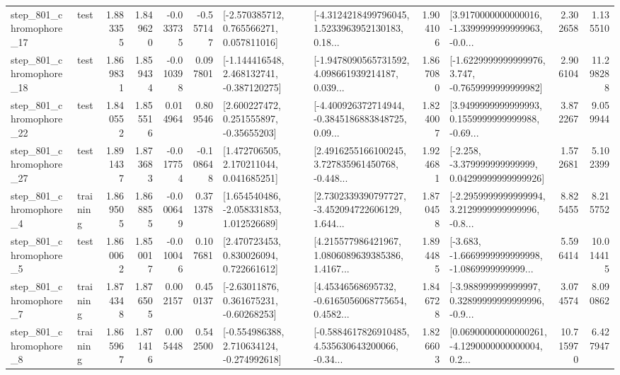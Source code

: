 \begin{tabular}{llrrrrllrlrr}
  step\_801\_chromophore\_17 &      test &      1.883355 &    1.849620 &     -0.033735 & -0.557147 &    [-2.570385712, 0.765566271, 0.057811016] &  [-4.3124218499796045, 1.5233963952130183, 0.18... &       1.904106 &  [3.9170000000000016, -1.3399999999999963, -0.0... &            2.302658 &          1.135510 \\
  step\_801\_chromophore\_18 &      test &      1.869831 &    1.859434 &     -0.010398 &  0.097801 &   [-1.144416548, 2.468132741, -0.387120275] &  [-1.9478090565731592, 4.098661939214187, 0.039... &       1.867080 &  [-1.6229999999999976, 3.747, -0.7659999999999982] &            2.906104 &         11.298288 \\
  step\_801\_chromophore\_22 &      test &      1.840552 &    1.855516 &      0.014964 &  0.809546 &     [2.600227472, 0.251555897, -0.35655203] &  [-4.400926372714944, -0.3845186883848725, 0.09... &       1.824007 &  [3.9499999999999993, 0.1559999999999988, -0.69... &            3.872267 &          9.059944 \\
  step\_801\_chromophore\_27 &      test &      1.891437 &    1.873683 &     -0.017754 & -0.108648 &     [1.472706505, 2.170211044, 0.041685251] &  [2.4916255166100245, 3.727835961450768, -0.448... &       1.924681 &  [-2.258, -3.379999999999999, 0.04299999999999926] &            1.572681 &          5.102399 \\
   step\_801\_chromophore\_4 &  training &      1.869505 &    1.868855 &     -0.000649 &  0.371378 &    [1.654540486, -2.058331853, 1.012526689] &  [2.7302339390797727, -3.452094722606129, 1.644... &       1.870458 &  [-2.2959999999999994, 3.2129999999999996, -0.8... &            8.825455 &          8.215752 \\
   step\_801\_chromophore\_5 &      test &      1.860062 &    1.850017 &     -0.010046 &  0.107681 &     [2.470723453, 0.830026094, 0.722661612] &  [4.215577986421967, 1.0806089639385386, 1.4167... &       1.894485 &  [-3.683, -1.6669999999999998, -1.0869999999999... &            5.596414 &         10.014415 \\
   step\_801\_chromophore\_7 &  training &      1.874348 &    1.876505 &      0.002157 &  0.450137 &     [-2.63011876, 0.361675231, -0.60268253] &  [4.45346568695732, -0.6165056068775654, 0.4582... &       1.846728 &  [-3.988999999999997, 0.32899999999999996, -0.9... &            3.074574 &          8.090862 \\
   step\_801\_chromophore\_8 &  training &      1.865967 &    1.871416 &      0.005448 &  0.542500 &   [-0.554986388, 2.710634124, -0.274992618] &  [-0.5884617826910485, 4.535630643200066, -0.34... &       1.826603 &  [0.06900000000000261, -4.1290000000000004, 0.2... &           10.715970 &          6.427947 \\

\end{tabular}
